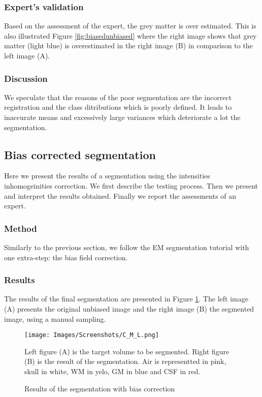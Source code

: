   
\subsubsection{Expert's validation}
Based on the assessment of the expert, the grey matter is over estimated. This is also illustrated Figure \ref{fig:biasedunbiased} where the right image shows that grey matter (light blue) is overestimated in the right image (B) in comparison to the left image (A).

\subsubsection{Discussion}
We speculate that the reasons of the poor segmentation are the incorrect registration and the class ditributions which is poorly defined. It leads to inaccurate means and excessively large variances which deteriorate a lot the segmentation.

\subsection{Bias corrected segmentation}
%
Here we present the results of a segmentation using the intensities inhomogeinities correction. We first describe the testing process. Then we present and interpret the results obtained. Finally we report the assessments of an expert.
%
\subsubsection{Method}
Similarly to the previous section, we follow the EM segmentation tutorial with one extra-step: the bias field correction.

%
\subsubsection{Results}
The results of the final segmentation are presented in Figure \ref{fig:C_M_L}. The left image (A) presents the original unbiased image and the right image (B) the segmented image, using a manual sampling. 
%

  \begin{figure}\centering
  \texttt{[image: Images/Screenshots/C\_M\_L.png]}
  \caption{Results of the segmentation with bias correction}{Left figure (A) is the target volume to be segmented. Right figure (B) is the result of the segmentation. Air is representted in pink, skull in white, WM in yelo, GM in blue and CSF in red.}\label{fig:C_M_L}
  \end{figure}

